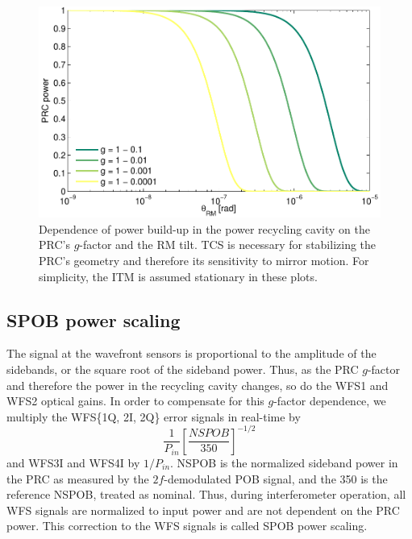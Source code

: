\begin{figure}
\begin{centering}
\includegraphics[width=1.0\columnwidth]{figures/prc_power.pdf}
\caption[Theoretical dependence of power recycling cavity power on
$g$-factor and mirror angle]{Dependence of power build-up in the power
  recycling cavity on the PRC's $g$-factor and the RM tilt. TCS is
  necessary for stabilizing the PRC's geometry and therefore its
  sensitivity to mirror motion. For simplicity, the ITM is assumed
  stationary in these plots.}
\label{fig:prc_power}
\end{centering}
\end{figure}


\subsection{SPOB power scaling}
The signal at the wavefront sensors is proportional to the amplitude
of the sidebands, or the square root of the sideband power. Thus, as
the PRC $g$-factor and therefore the power in the recycling cavity
changes, so do the WFS1 and WFS2 optical gains. In order to
compensate for this $g$-factor dependence, we multiply the WFS\{1Q,
2I, 2Q\} error signals in real-time by
\begin{equation}
\frac{1}{P_{in}} \left[\frac{NSPOB}{350}\right]^{-1/2}
\end{equation}
and WFS3I and WFS4I by $1/P_{in}$. NSPOB is the normalized sideband
power in the PRC as measured by the $2f$-demodulated POB signal, and
the 350 is the reference NSPOB, treated as nominal. Thus, during
interferometer operation, all WFS signals are normalized to input
power and are not dependent on the PRC power. This correction to the
WFS signals is called SPOB power scaling.

